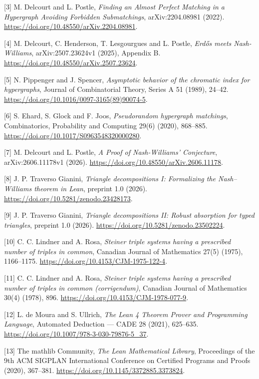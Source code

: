 \documentclass[english,11pt,a4paper]{article}
\begin{document}
{[}3{]} M. Delcourt and L. Postle, \emph{Finding an Almost Perfect Matching in a Hypergraph Avoiding Forbidden Submatchings}, arXiv:2204.08981 (2022). \url{https://doi.org/10.48550/arXiv.2204.08981}.

{[}4{]} M. Delcourt, C. Henderson, T. Lesgourgues and L. Postle, \emph{Erdős meets Nash-Williams}, arXiv:2507.23624v1 (2025), Appendix B. \url{https://doi.org/10.48550/arXiv.2507.23624}.

{[}5{]} N. Pippenger and J. Spencer, \emph{Asymptotic behavior of the chromatic index for hypergraphs}, Journal of Combinatorial Theory, Series A 51 (1989), 24--42. \url{https://doi.org/10.1016/0097-3165(89)90074-5}.

{[}6{]} S. Ehard, S. Glock and F. Joos, \emph{Pseudorandom hypergraph matchings}, Combinatorics, Probability and Computing 29(6) (2020), 868--885. \url{https://doi.org/10.1017/S0963548320000280}.

{[}7{]} M. Delcourt and L. Postle, \emph{A Proof of Nash-Williams' Conjecture}, arXiv:2606.11178v1 (2026). \url{https://doi.org/10.48550/arXiv.2606.11178}.

{[}8{]} J. P. Traverso Gianini, \emph{Triangle decompositions I: Formalizing the Nash--Williams theorem in Lean}, preprint 1.0 (2026). \url{https://doi.org/10.5281/zenodo.23428173}.

{[}9{]} J. P. Traverso Gianini, \emph{Triangle decompositions II: Robust absorption for typed triangles}, preprint 1.0 (2026). \url{https://doi.org/10.5281/zenodo.23502224}.

{[}10{]} C. C. Lindner and A. Rosa, \emph{Steiner triple systems having a prescribed number of triples in common}, Canadian Journal of Mathematics 27(5) (1975), 1166--1175. \url{https://doi.org/10.4153/CJM-1975-122-4}.

{[}11{]} C. C. Lindner and A. Rosa, \emph{Steiner triple systems having a prescribed number of triples in common (corrigendum)}, Canadian Journal of Mathematics 30(4) (1978), 896. \url{https://doi.org/10.4153/CJM-1978-077-9}.

{[}12{]} L. de Moura and S. Ullrich, \emph{The Lean 4 Theorem Prover and Programming Language}, Automated Deduction --- CADE 28 (2021), 625--635. \url{https://doi.org/10.1007/978-3-030-79876-5_37}.

{[}13{]} The mathlib Community, \emph{The Lean Mathematical Library}, Proceedings of the 9th ACM SIGPLAN International Conference on Certified Programs and Proofs (2020), 367--381. \url{https://doi.org/10.1145/3372885.3373824}.

\endgroup
\end{document}
